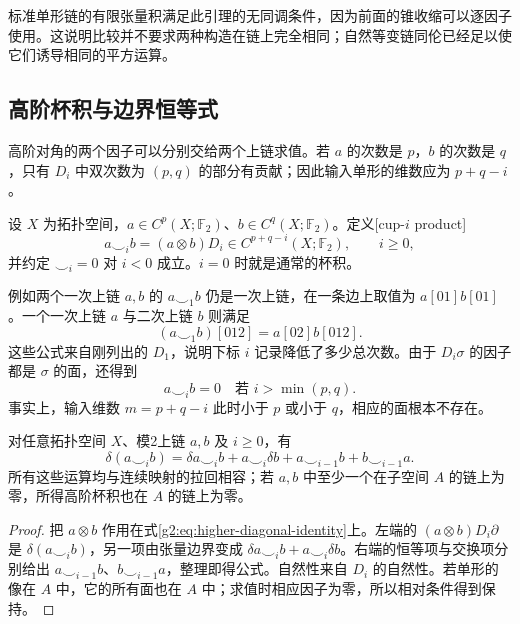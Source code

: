 标准单形链的有限张量积满足此引理的无同调条件，因为前面的锥收缩可以逐因子使用。这说明比较并不要求两种构造在链上完全相同；自然等变链同伦已经足以使它们诱导相同的平方运算。

\subsection{高阶杯积与边界恒等式}
\label{g2:subsec:1302:02}

高阶对角的两个因子可以分别交给两个上链求值。若 \(a\) 的次数是 \(p\)，\(b\) 的次数是 \(q\)，只有 \(D_i\) 中双次数为 \((p,q)\) 的部分有贡献；因此输入单形的维数应为 \(p+q-i\)。

\begin{definition}[高阶杯积]\label{g2:def:cup-i-product}
	设 \(X\) 为拓扑空间，\(a\in C^p(X;\mathbb F_2)\)、\(b\in C^q(X;\mathbb F_2)\)。定义[cup-\(i\) product]
	\[
		a\smile_i b=(a\otimes b)D_i\in C^{p+q-i}(X;\mathbb F_2),\qquad i\ge0,
	\]
	并约定 \(\smile_i=0\) 对 \(i<0\) 成立。\(i=0\) 时就是通常的杯积。
\end{definition}

例如两个一次上链 \(a,b\) 的 \(a\smile_1b\) 仍是一次上链，在一条边上取值为 \(a[01]b[01]\)。一个一次上链 \(a\) 与二次上链 \(b\) 则满足
\[
	(a\smile_1b)[012]=a[02]b[012].
\]
这些公式来自刚列出的 \(D_1\)，说明下标 \(i\) 记录降低了多少总次数。由于 \(D_i\sigma\) 的因子都是 \(\sigma\) 的面，还得到
\begin{equation}\label{g2:eq:cup-i-dimension}
	a\smile_i b=0\quad\text{若 }i>\min(p,q).
\end{equation}
事实上，输入维数 \(m=p+q-i\) 此时小于 \(p\) 或小于 \(q\)，相应的面根本不存在。

\begin{proposition}\label{g2:prop:cup-i-boundary}
	对任意拓扑空间 \(X\)、模2上链 \(a,b\) 及 \(i\ge0\)，有
	\begin{equation}\label{g2:eq:cup-i-boundary}
		\delta(a\smile_i b)=\delta a\smile_i b+a\smile_i\delta b
		+a\smile_{i-1}b+b\smile_{i-1}a.
	\end{equation}
	所有这些运算均与连续映射的拉回相容；若 \(a,b\) 中至少一个在子空间 \(A\) 的链上为零，所得高阶杯积也在 \(A\) 的链上为零。
\end{proposition}
\begin{proof}
	把 \(a\otimes b\) 作用在式\eqref{g2:eq:higher-diagonal-identity}上。左端的 \((a\otimes b)D_i\partial\) 是 \(\delta(a\smile_i b)\)，另一项由张量边界变成 \(\delta a\smile_i b+a\smile_i\delta b\)。右端的恒等项与交换项分别给出 \(a\smile_{i-1}b\)、\(b\smile_{i-1}a\)，整理即得公式。自然性来自 \(D_i\) 的自然性。若单形的像在 \(A\) 中，它的所有面也在 \(A\) 中；求值时相应因子为零，所以相对条件得到保持。
\end{proof}


